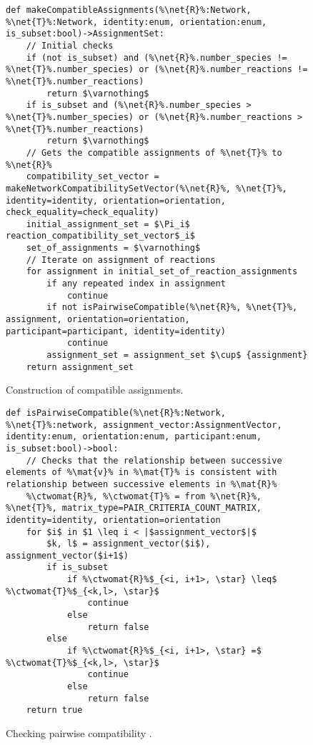 \documentclass{article}
\newcommand{\mat}[1]{${\bf #1}$} %
\newcommand{\net}[1]{$\mathcal{#1}$} %
\newcommand{\ctwomat}[1]{${\bf #1}^{{\bf c}^2}$} %
\begin{document}
\begin{figure}
\begin{lstlisting}[mathescape=true,escapechar=\%]
def makeCompatibleAssignments(%\net{R}%:Network, %\net{T}%:Network, identity:enum, orientation:enum, is_subset:bool)->AssignmentSet:
    // Initial checks
    if (not is_subset) and (%\net{R}%.number_species !=  %\net{T}%.number_species) or (%\net{R}%.number_reactions !=  %\net{T}%.number_reactions)
        return $\varnothing$
    if is_subset and (%\net{R}%.number_species >  %\net{T}%.number_species) or (%\net{R}%.number_reactions >  %\net{T}%.number_reactions)
        return $\varnothing$
    // Gets the compatible assignments of %\net{T}% to %\net{R}%
    compatibility_set_vector = makeNetworkCompatibilitySetVector(%\net{R}%, %\net{T}%, identity=identity, orientation=orientation, check_equality=check_equality)
    initial_assignment_set = $\Pi_i$ reaction_compatibility_set_vector$_i$
    set_of_assignments = $\varnothing$
    // Iterate on assignment of reactions
    for assignment in initial_set_of_reaction_assignments
        if any repeated index in assignment
            continue
        if not isPairwiseCompatible(%\net{R}%, %\net{T}%, assignment, orientation=orientation, participant=participant, identity=identity)
            continue
        assignment_set = assignment_set $\cup$ {assignment}
    return assignment_set 
\end{lstlisting}
\caption{Construction of compatible assignments.}\label{alg:makeCompatibleAssignments}
\end{figure}

\begin{figure}
\begin{lstlisting}[mathescape=true,escapechar=\%]
def isPairwiseCompatible(%\net{R}%:Network, %\net{T}%:network, assignment_vector:AssignmentVector, identity:enum, orientation:enum, participant:enum, is_subset:bool)->bool:
    // Checks that the relationship between successive elements of %\mat{v}% in %\mat{T}% is consistent with relationship between successive elements in %\mat{R}%
    %\ctwomat{R}%, %\ctwomat{T}% = from %\net{R}%, %\net{T}%, matrix_type=PAIR_CRITERIA_COUNT_MATRIX, identity=identity, orientation=orientation
    for $i$ in $1 \leq i < |$assignment_vector$|$
        $k, l$ = assignment_vector($i$), assignment_vector($i+1$)
        if is_subset
            if %\ctwomat{R}%$_{<i, i+1>, \star} \leq$ %\ctwomat{T}%$_{<k,l>, \star}$
                continue
            else
                return false
        else
            if %\ctwomat{R}%$_{<i, i+1>, \star} =$ %\ctwomat{T}%$_{<k,l>, \star}$
                continue
            else
                return false
    return true
\end{lstlisting}
\caption{Checking pairwise compatibility .}\label{alg:isPairwiseCompatible}
\end{figure}
\end{document}
